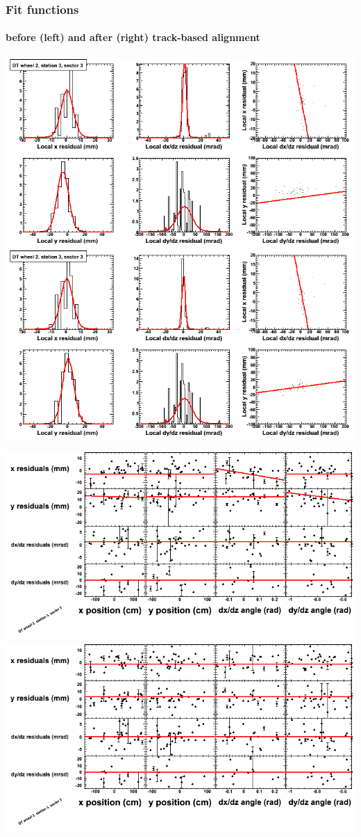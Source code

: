 \documentclass[compress]{beamer}
\begin{document}
\begin{frame}
\frametitle{Fit functions}
\framesubtitle{before (left) and after (right) track-based alignment}
\includegraphics[width=0.5\linewidth]{fitfunctions_re01/MBwhEst3sec03_bellcurves.png} \includegraphics[width=0.5\linewidth]{fitfunctions_re05/MBwhEst3sec03_bellcurves.png}

\includegraphics[width=0.5\linewidth]{fitfunctions_re01/MBwhEst3sec03_polynomials.png} \includegraphics[width=0.5\linewidth]{fitfunctions_re05/MBwhEst3sec03_polynomials.png}
\end{frame}
\end{document}
